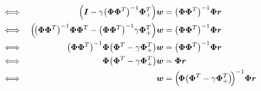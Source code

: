 \begin{align}
				\iff                                                                                                                                                    &                                                                                                                                        &
				\Big( \bm{I} - \gamma \big( \bm{\Phi} \bm{\Phi}^T \big)^{-1} \bm{\Phi}_+^T \Big) \bm{w}                                                            & = \big( \bm{\Phi} \bm{\Phi}^T \big)^{-1} \bm{\Phi} \bm{r}                                                                          & \nonumber               \\
				\iff                                                                                                                                                    &                                                                                                                                        &
				\Big(\! \big( \bm{\Phi} \bm{\Phi}^T \big)^{-1} \bm{\Phi} \bm{\Phi}^T - \big( \bm{\Phi} \bm{\Phi}^T \big)^{-1} \gamma \bm{\Phi}_+^T \Big) \bm{w} & = \big( \bm{\Phi} \bm{\Phi}^T \big)^{-1} \bm{\Phi} \bm{r}                                                                          & \nonumber               \\
				\iff                                                                                                                                                    &                                                                                                                                        &
				\big( \bm{\Phi} \bm{\Phi}^T \big)^{-1} \bm{\Phi} \big( \bm{\Phi}^T - \gamma \bm{\Phi}_+^T \big) \bm{w}                                            & = \big( \bm{\Phi} \bm{\Phi}^T \big)^{-1} \bm{\Phi} \bm{r}                                                                          & \nonumber               \\
				\iff                                                                                                                                                    &                                                                                                                                        &
				\bm{\Phi} \big( \bm{\Phi}^T - \gamma \bm{\Phi}_+^T \big) \bm{w}                                                                                     & = \bm{\Phi} \bm{r}                                                                                                                   & \nonumber               \\
				\iff                                                                                                                                                    &                                                                                                                                        &
				\bm{w}                                                                                                                                                 & = \Big(\! \bm{\Phi} \big( \bm{\Phi}^T - \gamma \bm{\Phi}_+^T \big) \!\Big)^{-1} \bm{\Phi} \bm{r}                                  & \label{eq:lstdSolution}
			\end{align}
